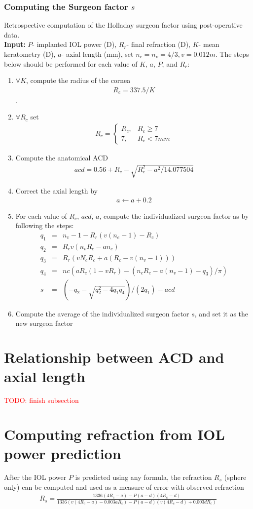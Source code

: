 \documentclass[article,twocolumn,preprint,10pt]{paper}%
\renewcommand{\(}{\left(}
\renewcommand{\)}{\right)}
\renewcommand{\[}{\left[}
\renewcommand{\]}{\right]}
\newcommand{\red}{\textcolor{red}}
\newcommand{\beq}{\begin{eqnarray}}
\newcommand{\eeq}{\end{eqnarray}}
\newcommand{\1}{\mbox{\boldmath$1$}}
\begin{document}
\subsubsection{Computing the Surgeon factor $s$}\label{subsubsection:theSurgeonFactor}
Retrospective computation of the Holladay surgeon factor using post-operative data.\\
\textbf{Input:} $P$- implanted IOL power (D), $R_r$- final refraction (D), $K$- mean keratometry (D), $a$- axial length (mm), set $n_c=n_v=4/3, v=0.012m$. The steps below should be performed for each value of $K$, $a$, $P$, and $R_r$:
\begin{enumerate}
	\item $\forall K$, compute the radius of the cornea \beq R_c = 337.5/K \nonumber \eeq.
	\item $\forall R_c$ set \beq R_c = \begin{cases}R_c, & R_c\geq 7\\
	7,& R_c<7mm\end{cases}\eeq 
	\item Compute the anatomical ACD \beq acd = 0.56+R_c-\sqrt{R_c^2 -a^2/14.077504}\eeq
	\item Correct the axial length by \beq a\leftarrow a+0.2 \eeq
	\item 
	For each value of $R_c$, $acd$, $a$, compute the individualized surgeon factor as by following the steps:
	\beq 
	  q_1 &=& n_v-1 - R_r(v(n_e-1)-R_c)\nonumber \\
	  q_2 &=& R_cv(n_vR_c-an_c) \nonumber \\
	  q_3 &=& R_r(vN_cR_c+a(R_c-v(n_v-1))) \nonumber \\
	  q_4 &=& nc(aR_c(1-vR_r)-(n_cR_c-a(n_v-1)-q_3)/\pi )\nonumber \\
	  s  &=& (-q_2-\sqrt{q_2^2-4q_1q_4})/(2q_1)-acd  
	\eeq 
	\item Compute the average of the individualized surgeon factor $s$, and set it as the new surgeon factor 
\end{enumerate}

\section{Relationship between ACD and axial length}
\red{TODO: finish subsection}

\section{Computing refraction from IOL power prediction}
After the IOL power $P$ is predicted using any formula, the refraction $R_s$ (sphere only) can be computed and used as a measure of error with observed refraction
\beq 
R_s = \frac{1336(4R_c-a)-P(a-d)(4R_c-d)}{1336(v(4R_c-a)-0.003aR_c)-P(a-d)(v(4R_c-d)+0.003dR_c)}
\eeq


\end{document}
